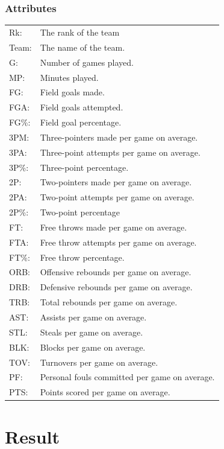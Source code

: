 \documentclass[conference]{IEEEtran}
\begin{document}
\subsubsection{Attributes}
\begin{flushleft}
\begin{tabular}{@{}ll@{}}
  
    Rk: &The rank of the team\\
    Team: &The name of the team.\\
    G: &Number of games played.\\
    MP: &Minutes played.\\
    FG: &Field goals made.\\
    FGA: &Field goals attempted.\\
    FG\%: &Field goal percentage.\\
    3PM: &Three-pointers made per game on average.\\
    3PA: &Three-point attempts per game on average.\\
    3P\%: &Three-point percentage.\\
    2P: &Two-pointers made per game on average.\\
    2PA: &Two-point attempts per game on average.\\
    2P\%: &Two-point percentage\\
    FT: &Free throws made per game on average.\\
    FTA: &Free throw attempts per game on average.\\
    FT\%: &Free throw percentage.\\
    ORB: &Offensive rebounds per game on average.\\
    DRB: &Defensive rebounds per game on average.\\
    TRB: &Total rebounds per game on average.\\
    AST: &Assists per game on average.\\
    STL: &Steals per game on average.\\
    BLK: &Blocks per game on average.\\
    TOV: &Turnovers per game on average.\\
    PF: &Personal fouls committed per game on average.\\
    PTS: &Points scored per game on average.\\
\end{tabular}
\end{flushleft}

\section{Result}
\end{document}
